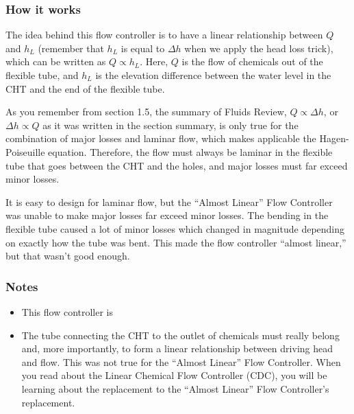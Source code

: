 \documentclass[letterpaper,10pt,english]{sphinxmanual}
\begin{document}
\subsubsection{How it works}
\label{\detokenize{Flow_Control_and_Measurement/FCM_Design:how-it-works}}
The idea behind this flow controller is to have a linear relationship between \(Q\) and \(h_L\) (remember that \(h_L\) is equal to \(\Delta h\) when we apply the head loss trick), which can be written as \(Q \propto h_L\). Here, \(Q\) is the flow of chemicals out of the flexible tube, and \(h_L\) is the elevation difference between the water level in the CHT and the end of the flexible tube.

As you remember from section 1.5, the summary of Fluids Review, \(Q \propto \Delta h\), or \(\Delta h \propto Q\) as it was written in the section summary, is only true for the combination of major losses and laminar flow, which makes applicable the Hagen-Poiseuille equation. Therefore, the flow must always be laminar in the flexible tube that goes between the CHT and the holes, and major losses must far exceed minor losses.

It is easy to design for laminar flow, but the “Almost Linear” Flow Controller was unable to make major losses far exceed minor losses. The bending in the flexible tube caused a lot of minor losses which changed in magnitude depending on exactly how the tube was bent. This made the flow controller “almost linear,” but that wasn’t good enough.


\subsubsection{Notes}
\label{\detokenize{Flow_Control_and_Measurement/FCM_Design:notes}}\begin{itemize}
\item {} 
This flow controller is 

\item {} 
The tube connecting the CHT to the outlet of chemicals must really belong and, more importantly,  to form a linear relationship between driving head and flow. This was not true for the “Almost Linear” Flow Controller. When you read about the Linear Chemical Flow Controller (CDC), you will be learning about the replacement to the “Almost Linear” Flow Controller’s replacement.

\end{itemize}
\end{document}

